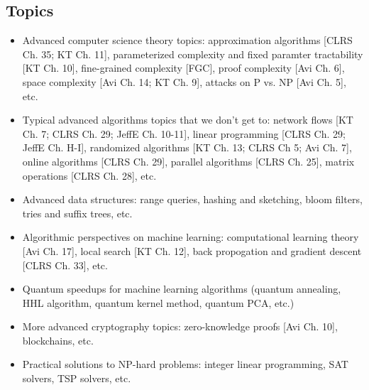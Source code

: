 \documentclass[11pt]{article}
\begin{document}
\subsection{Topics}
\begin{itemize}
    \item Advanced computer science theory topics: approximation algorithms
    [CLRS Ch. 35; KT Ch. 11], parameterized complexity and fixed paramter tractability [KT Ch. 10],
    fine-grained complexity [FGC], proof complexity [Avi Ch. 6], space complexity [Avi Ch. 14; KT Ch. 9], attacks on P
    vs. NP [Avi Ch. 5], etc.
    \item Typical advanced algorithms topics that we don't get to: network
    flows [KT Ch. 7; CLRS Ch. 29; JeffE Ch. 10-11], linear programming [CLRS Ch. 29; JeffE Ch. H-I], randomized algorithms [KT Ch. 13; CLRS Ch 5; Avi Ch. 7], 
    online algorithms [CLRS Ch. 29], parallel algorithms [CLRS Ch. 25], matrix operations [CLRS Ch. 28], 
    etc.
    \item Advanced data structures: range queries, hashing and sketching, bloom
    filters, tries and suffix trees, etc.
    \item Algorithmic perspectives on machine learning: computational learning theory [Avi Ch. 17], local search [KT Ch. 12], back
    propogation and gradient descent [CLRS Ch. 33], etc.
    \item Quantum speedups for machine learning algorithms (quantum annealing,
    HHL algorithm, quantum kernel method, quantum PCA, etc.)
    \item More advanced cryptography topics: zero-knowledge proofs [Avi Ch. 10], blockchains, etc.
    \item Practical solutions to NP-hard problems: integer linear programming,
    SAT solvers, TSP solvers, etc.
\end{itemize}
 
\end{document}
